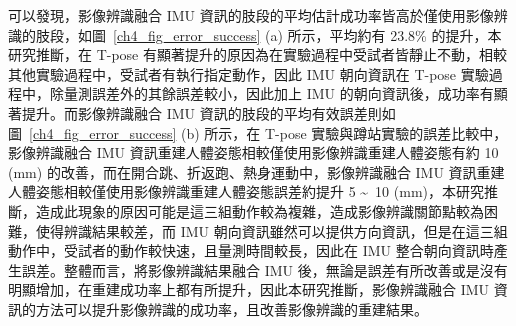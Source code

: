 可以發現，影像辨識融合 IMU 資訊的肢段的平均估計成功率皆高於僅使用影像辨識的肢段，如圖~\ref{ch4_fig_error_success} (a) 所示，平均約有 23.8\% 的提升，本研究推斷，在 T-pose 有顯著提升的原因為在實驗過程中受試者皆靜止不動，相較其他實驗過程中，受試者有執行指定動作，因此 IMU 朝向資訊在 T-pose 實驗過程中，除量測誤差外的其餘誤差較小，因此加上 IMU 的朝向資訊後，成功率有顯著提升。而影像辨識融合 IMU 資訊的肢段的平均有效誤差則如圖~\ref{ch4_fig_error_success} (b) 所示，在 T-pose 實驗與蹲站實驗的誤差比較中，影像辨識融合 IMU 資訊重建人體姿態相較僅使用影像辨識重建人體姿態有約 10 (mm) 的改善，而在開合跳、折返跑、熱身運動中，影像辨識融合 IMU 資訊重建人體姿態相較僅使用影像辨識重建人體姿態誤差約提升 5 \textasciitilde\ 10 (mm)，本研究推斷，造成此現象的原因可能是這三組動作較為複雜，造成影像辨識關節點較為困難，使得辨識結果較差，而 IMU 朝向資訊雖然可以提供方向資訊，但是在這三組動作中，受試者的動作較快速，且量測時間較長，因此在 IMU 整合朝向資訊時產生誤差。整體而言，將影像辨識結果融合 IMU 後，無論是誤差有所改善或是沒有明顯增加，在重建成功率上都有所提升，因此本研究推斷，影像辨識融合 IMU 資訊的方法可以提升影像辨識的成功率，且改善影像辨識的重建結果。


